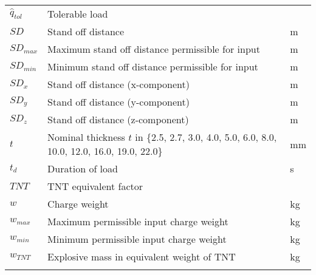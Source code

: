 \documentclass[12pt]{article}
\begin{document}
\begin{longtable*}{l l l}
\\
$\hat{q}_{tol}$ & Tolerable load & 
\\
$SD$ & Stand off distance & m
\\
$SD_{max}$ & Maximum stand off distance permissible for input & m
\\
$SD_{min}$ & Minimum stand off distance permissible for input & m
\\
$SD_{x}$ & Stand off distance (x-component) & m
\\
$SD_{y}$ & Stand off distance (y-component) & m
\\
$SD_{z}$ & Stand off distance (z-component) & m
\\
$t$ & Nominal thickness $t$ in \{2.5, 2.7, 3.0, 4.0, 5.0, 6.0, 8.0, 10.0, 12.0, 16.0, 19.0, 22.0\} & mm
\\
$t_{d}$ & Duration of load & s
\\
$TNT$ & TNT equivalent factor & 
\\
$w$ & Charge weight & kg
\\
$w_{max}$ & Maximum permissible input charge weight & kg
\\
$w_{min}$ & Minimum permissible input charge weight & kg
\\
$w_{TNT}$ & Explosive mass in equivalent weight of TNT & kg
\\
\bottomrule
\label{Table:TablofSymb}
\end{longtable*}
\end{document}
